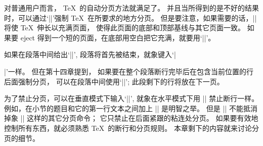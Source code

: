 对普通用户而言， \TeX\ 的自动分页方法就满足了。%
并且当所得到的是不好的结果时，可以通过`|\eject|'强制 \TeX\ 在所要求的地方分页。%
但是要注意，如果需要的话，|\eject| 将使 \TeX\ 伸长以充满页\hbox{面，}
使得此页面的底部和顶部基线与其它页面一致。%
如果要 eject 得到一个短的页面，在底部用空白把它充满，就要用`|\vfill\eject|'。

\danger 如果在段落中间给出`|\eject|', 段落将首先被结束，就象键入`|\par\eject|'一样。%
但在第十四章提\hbox{到，} 如果要在整个段落断行完毕后在包含当前位置的行后面强制分页，
可以在段落中间使用`|\vadjust||{\eject}|';
此段剩下的行将放在下一页。

\danger 为了禁止分页，可以在垂直模式下输入`|\nobreak|',
就象在水平模式下用 |\nobreak| 禁止断行一样。%
例如，在小节的题目和它的第一行文本之间加上 |\nobreak| 是明智之举。%
但是 |\nobreak| 不能抵消掉象 |\eject| 这样的其它分页命令；
它只禁止在后面紧跟的粘连处分页。%
如果要有效地控制所有东西，就必须熟悉 \TeX\ 的断行和分页规则。%
本章剩下的内容就来讨论分页的细节。

